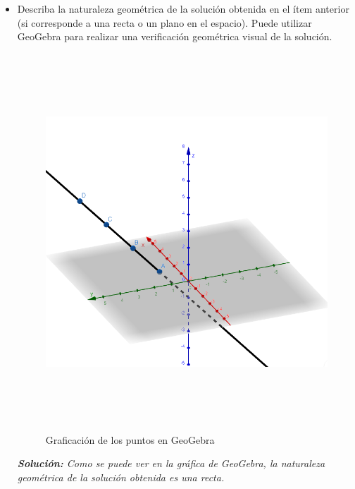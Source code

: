 \begin{itemize}
    \item Describa la naturaleza geométrica de la solución obtenida en el ítem anterior (si corresponde a una recta o un plano en el espacio). Puede utilizar GeoGebra para realizar una verificación geométrica visual de la solución.
    \begin{figure}[ht!]
        \centering
        \includegraphics[width=400pt,height=400pt]{img/imagen15.png}
        \caption{Graficación de los puntos en GeoGebra}
    \end{figure}
    \FloatBarrier
    \begin{center}
        \textit{\textbf{Solución: }Como se puede ver en la gráfica de GeoGebra, la naturaleza geométrica de la solución obtenida es una recta.}
    \end{center}
\end{itemize}